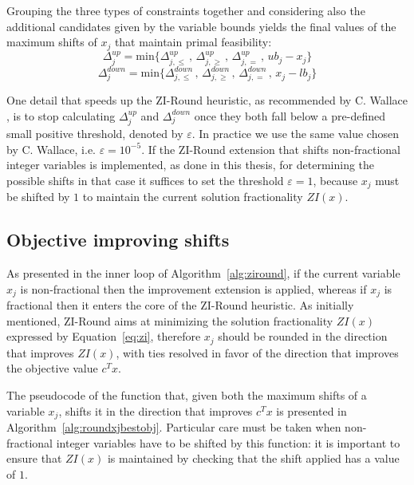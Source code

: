 \documentclass[a4paper,12pt]{book}
\begin{document}
Grouping the three types of constraints together and considering also the additional candidates given by the variable bounds yields the final values of the maximum shifts of $x_j$ that maintain primal feasibility:
\begin{equation}
	\Delta_{j}^{up} = \text{min} \{\Delta_{j,\leq}^{up} \,,\, \Delta_{j,\geq}^{up} \,,\, \Delta_{j,=}^{up} \,,\, ub_j - x_j\}
\end{equation}
\begin{equation}
	\Delta_{j}^{down} = \text{min} \{\Delta_{j,\leq}^{down} \,,\, \Delta_{j,\geq}^{down} \,,\, \Delta_{j,=}^{down} \,,\, x_j - lb_j\}
\end{equation}

One detail that speeds up the ZI-Round heuristic, as recommended by C. Wallace \cite{wallace2010}, is to stop calculating $\Delta_{j}^{up}$ and $\Delta_{j}^{down}$ once they both fall below a pre-defined small positive threshold, denoted by $\varepsilon$. In practice we use the same value chosen by C. Wallace, i.e. $\varepsilon = 10^{-5}$. If the ZI-Round extension that shifts non-fractional integer variables is implemented, as done in this thesis, for determining the possible shifts in that case it suffices to set the threshold $\varepsilon = 1$, because $x_j$ must be shifted by $1$ to maintain the current solution fractionality $ZI(x)$. \par

\subsection{Objective improving shifts}
As presented in the inner loop of Algorithm~\ref{alg:ziround}, if the current variable $x_j$ is non-fractional then the improvement extension is applied, whereas if $x_j$ is fractional then it enters the core of the ZI-Round heuristic. As initially mentioned, ZI-Round aims at minimizing the solution fractionality $ZI(x)$ expressed by Equation~\ref{eq:zi}, therefore $x_j$ should be rounded in the direction that improves $ZI(x)$, with ties resolved in favor of the direction that improves the objective value $c^Tx$. \par
The pseudocode of the function that, given both the maximum shifts of a variable $x_j$, shifts it in the direction that improves $c^Tx$ is presented in Algorithm~\ref{alg:roundxjbestobj}. Particular care must be taken when non-fractional integer variables have to be shifted by this function: it is important to ensure that $ZI(x)$ is maintained by checking that the shift applied has a value of $1$. \par
\end{document}
